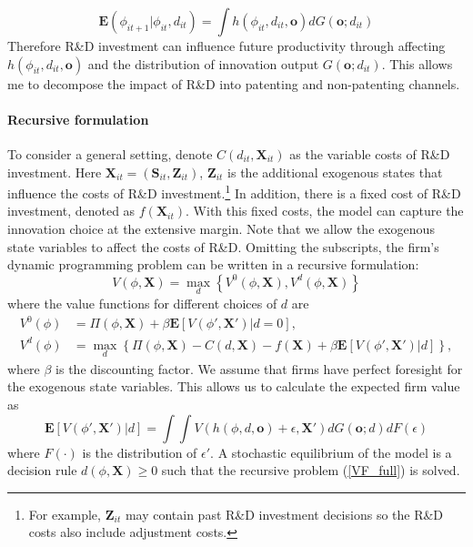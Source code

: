 \documentclass[11pt]{article}
\begin{document}
\begin{equation*}
    \mathbf{E}(\phi_{it+1}|\phi_{it}, d_{it})=\int h(\phi_{it},d_{it},\mathbf{o})dG(\mathbf{o};d_{it})
\end{equation*}
Therefore R\&D investment can influence future productivity through affecting $h(\phi_{it}, d_{it},\mathbf{o})$ and the distribution of innovation output $G(\mathbf{o}; d_{it})$. This allows me to decompose the impact of R\&D into patenting and non-patenting channels.


\paragraph{Recursive formulation}
To consider a general setting, denote $C(d_{it}, \mathbf{X}_{it})$ as the variable costs of R\&D investment. Here $\mathbf{X}_{it}=(\mathbf{S}_{it}, \mathbf{Z}_{it})$, $\mathbf{Z}_{it}$ is the additional exogenous states that influence the costs of R\&D investment.\footnote{For example, $\mathbf{Z}_{it}$ may contain past R\&D investment decisions so the R\&D costs also include adjustment costs.} In addition, there is a fixed cost of R\&D investment, denoted as $f(\mathbf{X}_{it})$. With this fixed costs, the model can capture the innovation choice at the extensive margin. Note that we allow the exogenous state variables to affect the costs of R\&D. Omitting the subscripts, the firm's dynamic programming problem can be written in a recursive formulation:
\begin{equation}\label{VF_full}
    V(\phi, \mathbf{X}) =\max_{d}\left\{V^0(\phi, \mathbf{X}), V^d(\phi, \mathbf{X})\right\} 
\end{equation}
where the value functions for different choices of $d$ are
\begin{align}
    V^0(\phi)&=\Pi(\phi,\mathbf{X})+ \beta \mathbf{E}\left[ V(\phi', \mathbf{X}')|d=0\right], \\
    V^d(\phi)&=\max_{d} \left\{ \Pi(\phi,\mathbf{X})-C(d, \mathbf{X}) - f(\mathbf{X}) + \beta \mathbf{E}\left[ V(\phi', \mathbf{X}')|d\right]\right\}, \label{VF_d}
\end{align}
where $\beta$ is the discounting factor. We assume that firms have perfect foresight for the exogenous state variables. This allows us to calculate the expected firm value as
\begin{equation}\label{EV_d}
    \mathbf{E}\left[ V(\phi', \mathbf{X}')|d\right] = \int\int V(h(\phi,d,\mathbf{o})+\epsilon,\mathbf{X}')dG(\mathbf{o};d)dF(\epsilon)
\end{equation}
where $F(\cdot)$ is the distribution of $\epsilon'$. 
A stochastic equilibrium of the model is a decision rule $d(\phi, \mathbf{X})\geq0$ such that the recursive problem (\ref{VF_full}) is solved.
\end{document}
